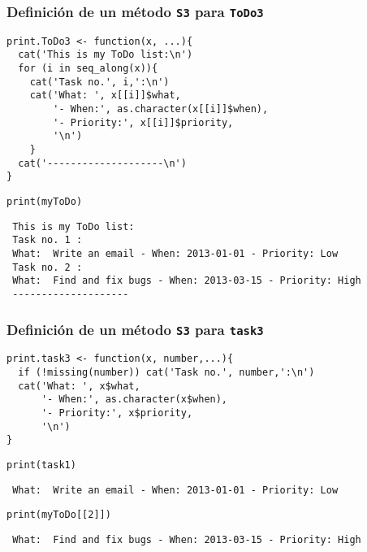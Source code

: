 \documentclass[xcolor={usenames,svgnames,dvipsnames}]{beamer}
\begin{document}
\begin{frame}[fragile]
\frametitle{Definición de un método \texttt{S3} para \texttt{ToDo3}}
\label{sec-2-2-3}



\lstset{language=R}
\begin{lstlisting}
print.ToDo3 <- function(x, ...){
  cat('This is my ToDo list:\n')
  for (i in seq_along(x)){
    cat('Task no.', i,':\n')
    cat('What: ', x[[i]]$what,
        '- When:', as.character(x[[i]]$when),
        '- Priority:', x[[i]]$priority,
        '\n')
    }
  cat('--------------------\n')
}
\end{lstlisting}



\lstset{language=R}
\begin{lstlisting}
print(myToDo)
\end{lstlisting}

\begin{verbatim}
 This is my ToDo list:
 Task no. 1 :
 What:  Write an email - When: 2013-01-01 - Priority: Low 
 Task no. 2 :
 What:  Find and fix bugs - When: 2013-03-15 - Priority: High 
 --------------------
\end{verbatim}
\end{frame}
\begin{frame}[fragile]
\frametitle{Definición de un método \texttt{S3} para \texttt{task3}}
\label{sec-2-2-4}


\lstset{language=R}
\begin{lstlisting}
print.task3 <- function(x, number,...){
  if (!missing(number)) cat('Task no.', number,':\n')
  cat('What: ', x$what,
      '- When:', as.character(x$when),
      '- Priority:', x$priority,
      '\n')
}
\end{lstlisting}



\lstset{language=R}
\begin{lstlisting}
print(task1)
\end{lstlisting}

\begin{verbatim}
 What:  Write an email - When: 2013-01-01 - Priority: Low
\end{verbatim}


\lstset{language=R}
\begin{lstlisting}
print(myToDo[[2]])
\end{lstlisting}

\begin{verbatim}
 What:  Find and fix bugs - When: 2013-03-15 - Priority: High
\end{verbatim}
\end{frame}
\end{document}
